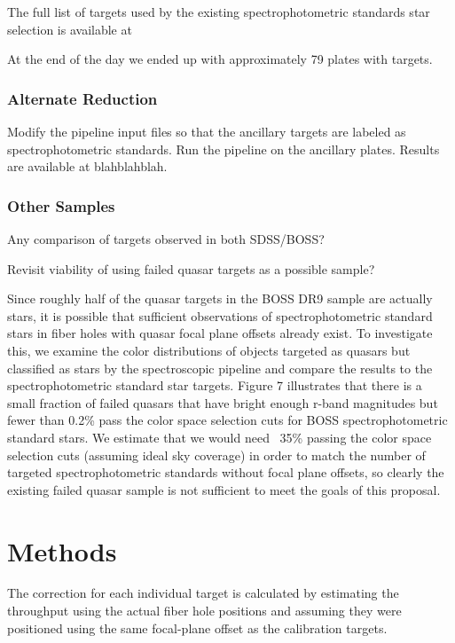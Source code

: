 \documentclass[preprint2]{aastex}
\begin{document}
The full list of targets used by the existing spectrophotometric standards star selection is available at %

At the end of the day we ended up with approximately 79 plates with targets.

\subsubsection{Alternate Reduction}

Modify the pipeline input files so that the ancillary targets are labeled as spectrophotometric standards. Run the pipeline on the ancillary plates. Results are available at blahblahblah.

\subsubsection{Other Samples}

Any comparison of targets observed in both SDSS/BOSS?

Revisit viability of using failed quasar targets as a possible sample?

Since roughly half of the quasar targets in the BOSS DR9 sample are actually stars, it is possible that sufficient observations of spectrophotometric standard stars in fiber holes with quasar focal plane offsets already exist. To investigate this, we examine the color distributions of objects targeted as quasars but classified as stars by the spectroscopic pipeline and compare the results to the spectrophotometric standard star targets. Figure 7 illustrates that there is a small fraction of failed quasars that have bright enough r-band magnitudes but fewer than 0.2\% pass the color space selection cuts for BOSS spectrophotometric standard stars. We estimate that we would need ~35\% passing the color space selection cuts (assuming ideal sky coverage) in order to match the number of targeted spectrophotometric standards without focal plane offsets, so clearly the existing failed quasar sample is not sufficient to meet the goals of this proposal.


\section{Methods}

The correction for each individual target is calculated by estimating the throughput using the actual fiber hole positions and assuming they were positioned using the same focal-plane offset as the calibration targets.
\end{document}
